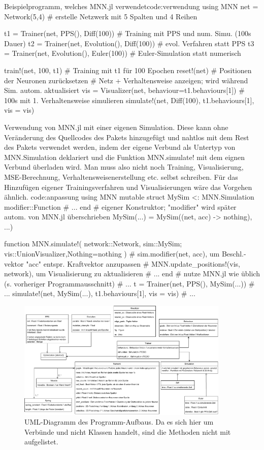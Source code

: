 \documentclass[10pt]{scrartcl}
\begin{document}
\begin{code}[1]{Beispielprogramm, welches MNN.jl verwendet}{code:verwendung}
using MNN
net = Network(5,4) # erstelle Netzwerk mit 5 Spalten und 4 Reihen

t1 = Trainer(net, PPS(), Diff(100)) # Training mit PPS und num. Simu. (100s Dauer)
t2 = Trainer(net, Evolution(), Diff(100)) # evol. Verfahren statt PPS
t3 = Trainer(net, Evolution(), Euler(100)) # Euler-Simulation statt numerisch

train!(net, 100, t1) # Training mit t1 für 100 Epochen
reset!(net) # Positionen der Neuronen zurücksetzen
# Netz + Verhaltensweise anzeigen; wird während Sim. autom. aktualisiert
vis = Visualizer(net, behaviour=t1.behaviours[1])
# 100s mit 1. Verhaltensweise simulieren
simulate!(net, Diff(100), t1.behaviours[1], vis = vis)
\end{code}

\begin{code}[1]{Verwendung von MNN.jl mit einer eigenen Simulation.
Diese kann ohne Veränderung des Quellcodes des Pakets hinzugefügt und nahtlos mit dem Rest des Pakets verwendet werden, indem der eigene Verbund als Untertyp von MNN.Simulation deklariert und die Funktion MNN.simulate! mit dem eignen Verbund überladen wird. 
Man muss also nicht noch Training, Visualisierung, MSE-Berechnung, Verhaltensweisenerstellung etc. selbst schreiben. Für das Hinzufügen eigener Trainingsverfahren und Visualisierungen wäre das Vorgehen ähnlich.
}{code:anpassung}
using MNN
mutable struct MySim <: MNN.Simulation
    modifier::Function
    # ...
end
# eigener Konstruktor; "modifier" wird später autom. von MNN.jl überschrieben
MySim(...) = MySim((net, acc) -> nothing), ...)

function MNN.simulate!(
    network::Network, sim::MySim; vis::Union{Visualizer,Nothing}=nothing
)
    # sim.modifier(net, acc), um Beschl.-vektor "acc" entspr. Kraftvektor anzupassen
    # MNN.update_positions!(vis, network), um Visualisierung zu aktualisieren
    # ...
end
# nutze MNN.jl wie üblich (s. vorheriger Programmausschnitt)
# ...
t = Trainer(net, PPS(), MySim(...))
# ...
simulate!(net, MySim(...), t1.behaviours[1], vis = vis)
# ...
\end{code}


\begin{figure}[H]
    \centering
    \includegraphics[width=0.9\textwidth]{bilder/UML.pdf}
    \caption{UML-Diagramm des Programm-Aufbaus. Da es sich hier um Verbünde und nicht Klassen handelt, sind die Methoden nicht mit aufgelistet.}
    \label{fig:uml}
\end{figure}
\end{document}
